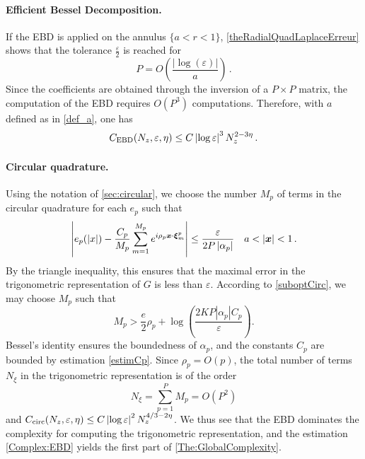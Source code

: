 \documentclass[smallextended]{svjour3}
\begin{document}
\paragraph{Efficient Bessel Decomposition.}
If the EBD is applied on the annulus $\{a < r < 1\}$, \autoref{theRadialQuadLaplaceErreur} shows that the tolerance $\frac{\varepsilon}{2}$ is reached for 
\begin{equation}
	\label{eq:valeurDePenFonctionDe_a}
	P = O\left(\dfrac{|\log(\varepsilon)|}{a}\right)\,.
\end{equation}
Since the coefficients are obtained through the inversion of a $P \times P$ matrix, the computation of the EBD requires $O(P^3)$ computations. Therefore, with $a$ defined as in \eqref{def_a}, one has
\begin{equation}
	\label{Complex:EBD}
	C_{\textup{EBD}}(N_z,\varepsilon,\eta) \leq C \left\lvert \log\varepsilon \right\rvert^3 N_z^{2 - 3\eta}\,.
\end{equation}

\paragraph{Circular quadrature.} Using the notation of \autoref{sec:circular}, we choose the number $M_p$ of terms in the circular quadrature for each $e_p$ such that
\begin{equation}
	\label{temp1}
	\left\lvert e_p(|x|) - \dfrac{C_p}{M_p}\sum_{m=1}^{M_p} e^{i \rho_p \boldsymbol{x} \cdot \boldsymbol{\xi}_m^p} \right\rvert \leq \frac{\varepsilon}{2P \left\lvert \alpha_p \right\rvert} \quad a < \left\lvert \boldsymbol{x} \right\rvert < 1\,.
\end{equation}
By the triangle inequality, this ensures that the maximal error in the trigonometric representation of $G$ is less than $\varepsilon$. According to  \autoref{suboptCirc}, we may choose $M_p$ such that
\begin{equation}
	M_p > \frac{e}{2} \rho_p + \log\left(\dfrac{2KP |\alpha_p|C_p}{\varepsilon}\right).
\end{equation} 
Bessel's identity ensures the boundedness of $\alpha_p$, and the constants $C_p$ are bounded by estimation \eqref{estimCp}. Since $\rho_p = O(p)$, the total number of terms  $N_\xi$  in the trigonometric representation is of the order
\begin{equation}
	\label{eq:NxiEnFonctionDeP}
	N_\xi = \sum_{p = 1}^P M_p = O(P^2)
\end{equation}
and $C_\text{circ}(N_z,\varepsilon,\eta) \leq C \left\lvert \log\varepsilon \right\rvert^2 N_z^{4/3 - 2\eta}$. We thus see that the EBD dominates the complexity for computing the trigonometric representation, and the estimation \eqref{Complex:EBD} yields the first part of \autoref{The:GlobalComplexity}.
\end{document}
